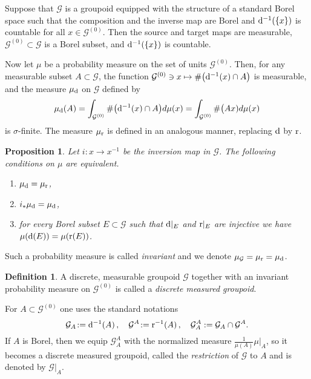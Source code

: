 \documentclass[a4paper,11pt]{article}
\numberwithin{equation}{section}
\newtheorem{prop}[thm]{Proposition}
\theoremstyle{definition}
\newtheorem{defn}[thm]{Definition}
\theoremstyle{remark}
\numberwithin{equation}{section}
\newcommand{\rG}{\mathcal{G}}
\def\r{{\rm r}}
\def\d{{\rm d}}
\numberwithin{equation}{section}
\begin{document}
Suppose that $\rG$ is a groupoid equipped with the structure of a standard Borel space 
such that the composition and the inverse map are Borel and 
$\d^{-1}(\{x\})$ is countable for all $x\in\rG^{(0)}$. Then the source and target maps are measurable, $\rG^{(0)}\subset\rG$ is 
a Borel subset, and $\d^{-1}(\{x\})$ is countable.


Now let $\mu$ be a probability measure on 
the set of units $\rG^{(0)}$. Then, 
for any measurable subset $A\subset\rG$, the function 
$\rG^{(0)}\ni x\mapsto \#\bigl (\d^{-1}(x)\cap A\bigr )$ 
is measurable, and the measure $\mu_\d$ on $\rG$ defined by 
$$
\mu_\d(A)=\int_{\rG^{(0)}} \#\bigl (\d^{-1}(x)\cap A\bigr )d\mu (x)=\int_{\rG^{(0)}} \#\bigl (Ax)d\mu (x)
$$
is $\sigma$-finite. The measure $\mu_\r$ is defined in an analogous manner, replacing $\d$ by $\r$. 

\begin{prop}\label{invr} Let $i: x\to x^{-1}$ be the inversion map in $\rG$. The following conditions on $\mu$ are equivalent. 
\begin{enumerate}
\item $\mu_\d=\mu_\r$, 
\item $i_*\mu_\d=\mu_\d$, 
\item for every Borel subset $E\subset\rG$ such that 
$\d|_{ E}$ and $\r|_{E}$ are injective we have 
$\mu(\d(E))=\mu(\r(E))$. 
\end{enumerate}
\end{prop}
Such a probability measure is called {\it invariant} and we denote $\mu_\rG=\mu_\r=\mu_\d$.

\begin{defn}\label{measuredgroupoid}
A discrete, measurable groupoid $\rG$ together with an invariant
probability measure 
on $\rG^{(0)}$ is 
called a {\it discrete measured groupoid}. 
\end{defn}

For $A\subset\rG^{(0)}$ one uses the standard notations 
\begin{equation*}\label{faneaka}
\rG_A\!:={\rm d}^{-1}(A)\,,\quad\rG^A\!:={\rm r}^{-1}(A)\,,\quad\rG_A^A:=\rG_A\cap\rG^A.
\end{equation*} If $A$ is Borel, then we equip $\rG_A^A$ with the normalized measure $\frac{1}{\mu(A)}\mu|_{A}$, so it becomes 
a discrete measured groupoid, called the {\it restriction} of 
$\rG$ to $A$ and is denoted by $\rG|_A$. 
\end{document}
